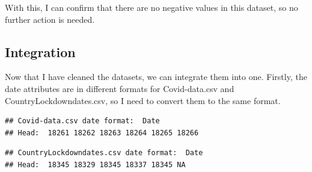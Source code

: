 \documentclass[
]{article}
\newenvironment{Shaded}{\begin{snugshade}}{\end{snugshade}}
\newcommand{\AttributeTok}[1]{\textcolor[rgb]{0.13,0.29,0.53}{#1}}
\newcommand{\FunctionTok}[1]{\textcolor[rgb]{0.13,0.29,0.53}{\textbf{#1}}}
\newcommand{\NormalTok}[1]{#1}
\newcommand{\OtherTok}[1]{\textcolor[rgb]{0.56,0.35,0.01}{#1}}
\newcommand{\SpecialCharTok}[1]{\textcolor[rgb]{0.81,0.36,0.00}{\textbf{#1}}}
\newcommand{\StringTok}[1]{\textcolor[rgb]{0.31,0.60,0.02}{#1}}
\begin{document}
With this, I can confirm that there are no negative values in this
dataset, so no further action is needed. \vspace{1cm}

\subsection{Integration}\label{integration}

Now that I have cleaned the datasets, we can integrate them into one.
Firstly, the date attributes are in different formats for Covid-data.csv
and CountryLockdowndates.csv, so I need to convert them to the same
format.

\begin{Shaded}
\end{Shaded}

\begin{verbatim}
## Covid-data.csv date format:  Date 
## Head:  18261 18262 18263 18264 18265 18266
\end{verbatim}

\begin{verbatim}
## CountryLockdowndates.csv date format:  Date 
## Head:  18345 18329 18345 18337 18345 NA
\end{verbatim}

\vspace{1cm}
\end{document}
